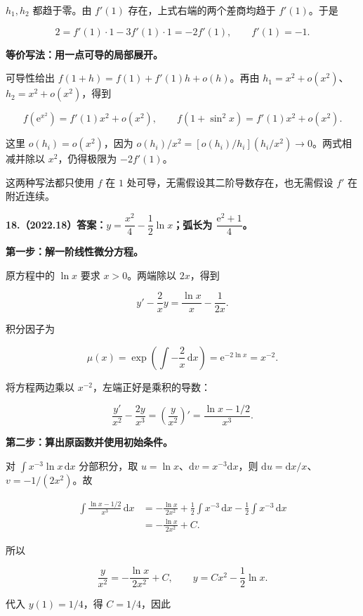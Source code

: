 \documentclass[UTF8,11pt,fontset=windows]{ctexart}
\begin{document}
$h_1,h_2$ 都趋于零。由 $f'(1)$ 存在，上式右端的两个差商均趋于 $f'(1)$。于是

$$
2=f'(1)\cdot1-3f'(1)\cdot1=-2f'(1),
\qquad \boxed{f'(1)=-1}.
$$

\textbf{等价写法：用一点可导的局部展开。}

可导性给出 $f(1+h)=f(1)+f'(1)h+o(h)$。再由 $h_1=x^2+o(x^2)$、$h_2=x^2+o(x^2)$，得到

$$
f(\mathrm e^{x^2})=f'(1)x^2+o(x^2),
\qquad
f(1+\sin^2x)=f'(1)x^2+o(x^2).
$$

这里 $o(h_i)=o(x^2)$，因为 $o(h_i)/x^2=[o(h_i)/h_i](h_i/x^2)\to0$。两式相减并除以 $x^2$，仍得极限为 $-2f'(1)$。

这两种写法都只使用 $f$ 在 $1$ 处可导，无需假设其二阶导数存在，也无需假设 $f'$ 在附近连续。

\clearpage

\textbf{18.（2022.18）答案：$y=\dfrac{x^2}{4}-\dfrac12\ln x$；弧长为 $\dfrac{\mathrm e^2+1}{4}$。}

\textbf{第一步：解一阶线性微分方程。}

原方程中的 $\ln x$ 要求 $x>0$。两端除以 $2x$，得到

$$
y'-\frac2x y=\frac{\ln x}{x}-\frac1{2x}.
$$

积分因子为

$$
\mu(x)=\exp\left(\int-\frac2x\,\mathrm dx\right)
=\mathrm e^{-2\ln x}=x^{-2}.
$$

将方程两边乘以 $x^{-2}$，左端正好是乘积的导数：

$$
\frac{y'}{x^2}-\frac{2y}{x^3}
=\left(\frac y{x^2}\right)'
=\frac{\ln x-1/2}{x^3}.
$$

\textbf{第二步：算出原函数并使用初始条件。}

对 $\int x^{-3}\ln x\,\mathrm dx$ 分部积分，取 $u=\ln x$、$\mathrm dv=x^{-3}\mathrm dx$，则 $\mathrm du=\mathrm dx/x$、$v=-1/(2x^2)$。故

$$
\begin{aligned}
\int\frac{\ln x-1/2}{x^3}\,\mathrm dx
&=-\frac{\ln x}{2x^2}
+\frac12\int x^{-3}\,\mathrm dx
-\frac12\int x^{-3}\,\mathrm dx\\
&=-\frac{\ln x}{2x^2}+C.
\end{aligned}
$$

所以

$$
\frac y{x^2}=-\frac{\ln x}{2x^2}+C,
\qquad y=Cx^2-\frac12\ln x.
$$

代入 $y(1)=1/4$，得 $C=1/4$，因此
\end{document}
